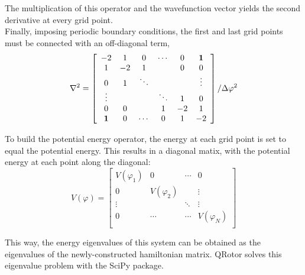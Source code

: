 \documentclass[12pt,a4paper]{article}
\begin{document}
The multiplication of this operator and the wavefunction vector yields the second derivative at every grid point.\\

Finally, imposing periodic boundary conditions, the first and last grid points must be connected with an off-diagonal term,
\[
    \nabla^2 =
    \left[ {\begin{array}{cccccc}
    -2      &  1     &  0     & \cdots &  0    &  \bf{1} \\
     1      & -2     &  1     &        &  0    &  0      \\
     0      &  1     & \ddots &        &       &  \vdots \\
     \vdots &        &        & \ddots &  1    &  0      \\
     0      &  0     &        &  1     & -2    &  1      \\
     \bf{1} &  0     & \cdots &  0     &  1    & -2      \\
    \end{array} } \right] / \Delta\varphi^2
\]

To build the potential energy operator, the energy at each grid point is set to equal the potential energy.
This results in a diagonal matix, with the potential energy at each point along the diagonal:
\[
    V(\varphi) =
    \left[ {\begin{array}{cccc}
    V(\varphi_1) &  0            &  \cdots &  0          \\
     0           &  V(\varphi_2) &         &  \vdots     \\
     \vdots      &               &  \ddots &   \vdots     \\
     0           &   \cdots      &  \cdots & V(\varphi_N) \\
    \end{array} } \right]
\]

This way, the energy eigenvalues of this system can be obtained as the eigenvalues of the newly-constructed hamiltonian matrix. QRotor solves this eigenvalue problem with the SciPy package.

\end{document}
